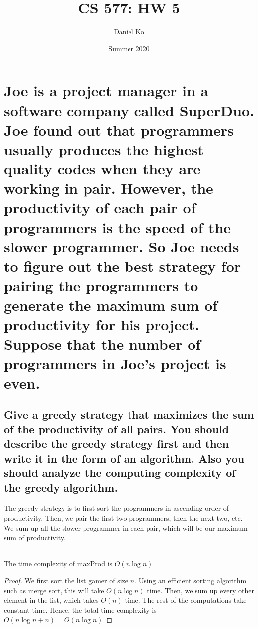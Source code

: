 \documentclass[11pt]{scrartcl}
\title{CS 577: HW 5}
\author{Daniel Ko}
\date{Summer 2020}
\begin{document}
\maketitle

\section{
	Joe is a project manager in a software company called SuperDuo. Joe found out that
	programmers usually produces the highest quality codes when they are working in pair.
	However, the productivity of each pair of programmers is the speed of the slower
	programmer. So Joe needs to figure out the best strategy for pairing the programmers to
	generate the maximum sum of productivity for his project. Suppose that the number of
	programmers in Joe’s project is even.
}

\subsection{
	Give a greedy strategy that maximizes the sum of the productivity of all
	pairs. You should describe the greedy strategy first and then write it in the form of an
	algorithm. Also you should analyze the computing complexity of the greedy
	algorithm.
}
The greedy strategy is to first sort the programmers in ascending order of productivity.
Then, we pair the first two programmers, then the next two, etc. We sum up all the 
slower programmer in each pair, which will be our maximum sum of productivity.  
\begin{algorithm}
\end{algorithm}\\
The time complexity of maxProd is $O(n\log n)$
\begin{proof}
	We first sort the list gamer of size $n$. Using an efficient sorting algorithm such as 
	merge sort, this will take $O(n\log n)$ time. Then, we sum up every other element 
	in the list, which takes $O(n)$ time. The rest of the computations take constant time.
	Hence, the total time complexity is $O(n\log n + n) = O(n\log n)$
\end{proof}
\end{document}
